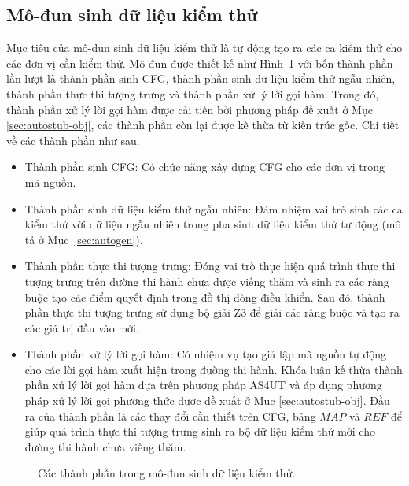 \subsection{Mô-đun sinh dữ liệu kiểm thử}\label{sec:module-autogen}
Mục tiêu của mô-đun sinh dữ liệu kiểm thử là tự động tạo ra các ca kiểm thử cho các đơn vị cần kiểm thử. Mô-đun được thiết kế như Hình~\ref{fig:module-autogen} với bốn thành phần lần lượt là thành phần sinh CFG, thành phần sinh dữ liệu kiểm thử ngẫu nhiên, thành phần thực thi tượng trưng và thành phần xử lý lời gọi hàm. Trong đó, thành phần xử lý lời gọi hàm được cải tiến bởi phương pháp đề xuất ở Mục \ref{sec:autostub-obj}, các thành phần còn lại được kế thừa từ kiến trúc gốc. Chi tiết về các thành phần như sau.
\begin{itemize}
    \item Thành phần sinh CFG: Có chức năng xây dựng CFG cho các đơn vị trong mã nguồn.
    \item Thành phần sinh dữ liệu kiểm thử ngẫu nhiên: Đảm nhiệm vai trò sinh các ca kiểm thử với dữ liệu ngẫu nhiên trong pha sinh dữ liệu kiểm thử tự động (mô tả ở Mục~\ref{sec:autogen}). 
    \item Thành phần thực thi tượng trưng: Đóng vai trò thực hiện quá trình thực thi tượng trưng trên đường thi hành chưa được viếng thăm và sinh ra các ràng buộc tạo các điểm quyết định trong đồ thị dòng điều khiển. Sau đó, thành phần thực thi tượng trưng sử dụng bộ giải Z3 để giải các ràng buộc và tạo ra các giá trị đầu vào mới.
    \item Thành phần xử lý lời gọi hàm: Có nhiệm vụ tạo giả lập mã nguồn tự động cho các lời gọi hàm xuất hiện trong đường thi hành. Khóa luận kế thừa thành phần xử lý lời gọi hàm dựa trên phương pháp AS4UT và áp dụng phương pháp xử lý lời gọi phương thức được đề xuất ở Mục \ref{sec:autostub-obj}. Đầu ra của thành phần là các thay đổi cần thiết trên CFG, bảng $MAP$ và $REF$ để giúp quá trình thực thi tượng trưng sinh ra bộ dữ liệu kiểm thử mới cho đường thi hành chưa viếng thăm.
\end{itemize}

\begin{figure}[h]
    \centering
    
    \caption{Các thành phần trong mô-đun sinh dữ liệu kiểm thử.}
    \label{fig:module-autogen}
\end{figure}
%     

